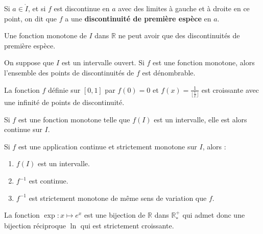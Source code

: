 
	\begin{definition}
		Si $a \in \mathring{I}$, et si $f$ est discontinue en $a$ avec des limites à gauche et à droite en ce point, on dit que $f$ a une \textbf{discontinuité de première espèce} en $a$.
	\end{definition}

	\begin{proposition}
		Une fonction monotone de $I$ dans $\mathbb{R}$ ne peut avoir que des discontinuités de première espèce.
	\end{proposition}

	\begin{theorem}
		On suppose que $I$ est un intervalle ouvert. Si $f$ est une fonction monotone, alors l'ensemble des points de discontinuités de $f$ est dénombrable.
	\end{theorem}

	\begin{example}
		La fonction $f$ définie sur $[0,1]$ par $f(0) = 0$ et $f(x) = \frac{1}{\lfloor \frac{1}{x} \rfloor}$ est croissante avec une infinité de points de discontinuité.
	\end{example}


	\begin{proposition}
		Si $f$ est une fonction monotone telle que $f(I)$ est un intervalle, elle est alors continue sur $I$.
	\end{proposition}

	\begin{theorem}[Bijection]
		Si $f$ est une application continue et strictement monotone sur $I$, alors :
		\begin{enumerate}[label=(\roman*)]
			\item $f(I)$ est un intervalle.
			\item $f^{-1}$ est continue.
			\item $f^{-1}$ est strictement monotone de même sens de variation que $f$.
		\end{enumerate}
	\end{theorem}

	\begin{example}
		La fonction $\exp : x \mapsto e^x$ est une bijection de $\mathbb{R}$ dans $\mathbb{R}^{+}_{*}$ qui admet donc une bijection réciproque $\ln$ qui est strictement croissante.
	\end{example}


